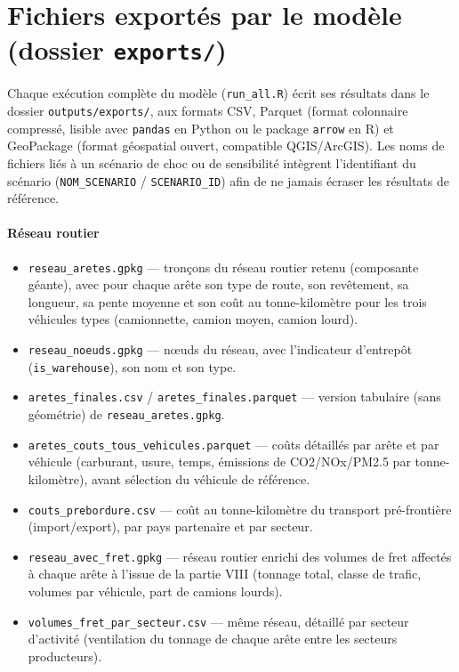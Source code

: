 \documentclass[12pt,a4paper,french]{report}
\begin{document}
		\section{Fichiers exportés par le modèle (dossier \texttt{exports/})}
		\label{subsubsec:annexe_exports}

		Chaque exécution complète du modèle (\texttt{run\_all.R}) écrit ses résultats dans le dossier \texttt{outputs/exports/}, aux formats CSV, Parquet (format colonnaire compressé, lisible avec \texttt{pandas} en Python ou le package \texttt{arrow} en R) et GeoPackage (format géospatial ouvert, compatible QGIS/ArcGIS). Les noms de fichiers liés à un scénario de choc ou de sensibilité intègrent l'identifiant du scénario (\texttt{NOM\_SCENARIO} / \texttt{SCENARIO\_ID}) afin de ne jamais écraser les résultats de référence.

		\paragraph{Réseau routier}
		\begin{itemize}
			\item \texttt{reseau\_aretes.gpkg} — tronçons du réseau routier retenu (composante géante), avec pour chaque arête son type de route, son revêtement, sa longueur, sa pente moyenne et son coût au tonne-kilomètre pour les trois véhicules types (camionnette, camion moyen, camion lourd).
			\item \texttt{reseau\_noeuds.gpkg} — nœuds du réseau, avec l'indicateur d'entrepôt (\texttt{is\_warehouse}), son nom et son type.
			\item \texttt{aretes\_finales.csv} / \texttt{aretes\_finales.parquet} — version tabulaire (sans géométrie) de \texttt{reseau\_aretes.gpkg}.
			\item \texttt{aretes\_couts\_tous\_vehicules.parquet} — coûts détaillés par arête et par véhicule (carburant, usure, temps, émissions de CO2/NOx/PM2.5 par tonne-kilomètre), avant sélection du véhicule de référence.
			\item \texttt{couts\_prebordure.csv} — coût au tonne-kilomètre du transport pré-frontière (import/export), par pays partenaire et par secteur.
			\item \texttt{reseau\_avec\_fret.gpkg} — réseau routier enrichi des volumes de fret affectés à chaque arête à l'issue de la partie VIII (tonnage total, classe de trafic, volumes par véhicule, part de camions lourds).
			\item \texttt{volumes\_fret\_par\_secteur.csv} — même réseau, détaillé par secteur d'activité (ventilation du tonnage de chaque arête entre les secteurs producteurs).
		\end{itemize}
\end{document}

